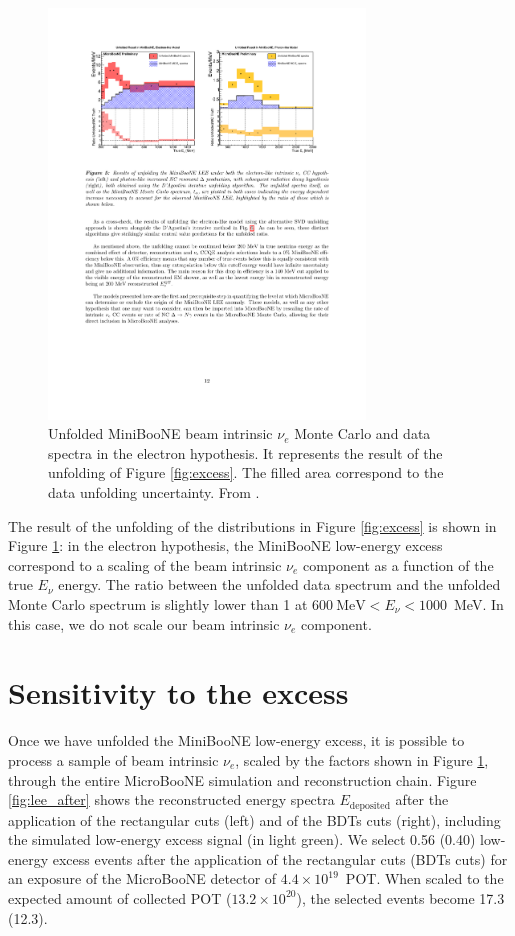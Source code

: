 \begin{figure}[htbp]
\centering
\includegraphics[width=0.75\textwidth]{figures/lee_result.pdf} 
\caption{Unfolded MiniBooNE beam intrinsic $\nu_e$ Monte Carlo and data spectra in the electron hypothesis. It represents the result of the unfolding of Figure \ref{fig:excess}. The filled area correspond to the data unfolding uncertainty. From \cite{lee_unfolding}.} 
\label{fig:lee_scaling}
\end{figure}

The result of the unfolding of the distributions in Figure \ref{fig:excess} is shown in Figure \ref{fig:lee_scaling}: in the electron hypothesis, the MiniBooNE low-energy excess correspond to a scaling of the beam intrinsic $\nu_e$ component as a function of the true $E_{\nu}$ energy. The ratio between the unfolded data spectrum and the unfolded Monte Carlo spectrum is slightly lower than 1 at $600~\mathrm{MeV} < E_{\nu} < 1000$~MeV. In this case, we do not scale our beam intrinsic $\nu_e$ component.

\section{Sensitivity to the excess}
Once we have unfolded the MiniBooNE low-energy excess, it is possible to process a sample of beam intrinsic $\nu_e$, scaled by the factors shown in Figure \ref{fig:lee_scaling}, through the entire MicroBooNE simulation and reconstruction chain. Figure \ref{fig:lee_after} shows the reconstructed energy spectra $E_{\mathrm{deposited}}$ after the application of the rectangular cuts (left) and of the BDTs cuts (right), including the simulated low-energy excess signal (in light green). We select 0.56 (0.40) low-energy excess events after the application of the rectangular cuts (BDTs cuts) for an exposure of the MicroBooNE detector of $4.4\times10^{19}$~POT. When scaled to the expected amount of collected POT ($13.2\times10^{20}$), the selected events become 17.3 (12.3).

